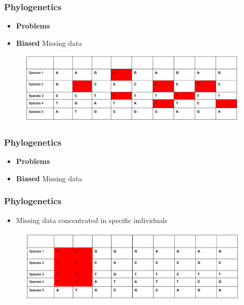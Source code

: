 \documentclass{beamer}
\begin{document}
\begin{frame}
\frametitle{Phylogenetics}
\begin{itemize}
\item \textbf{Problems}
\item \textbf{Biased} Missing data
\end{itemize}
\begin{figure}
    \includegraphics[scale=0.25]{Rando.png}
    \end{figure}
\end{frame}

\begin{frame}
\frametitle{Phylogenetics}
\begin{itemize}
\item \textbf{Problems}
\item \textbf{Biased} Missing data

\end{itemize}
\end{frame}



\begin{frame}
\frametitle{Phylogenetics}
\begin{itemize}
\item Missing data concentrated in specific individuals
\end{itemize}
\begin{figure}
    \includegraphics[scale=0.25]{individualized.png}
    \end{figure}
\end{frame}
\end{document}
